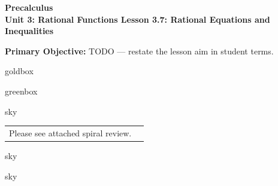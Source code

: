 \documentclass[10pt]{article}
\newcommand{\CourseName}{Precalculus}
\newcommand{\UnitNumberName}{Unit 3: Rational Functions \quad}
\newcommand{\LessonNumberName}{Lesson 3.7: Rational Equations and Inequalities}
\begin{document}
\begin{center}
    {\Large\bfseries \CourseName \\
    {\small\bfseries \UnitNumberName \LessonNumberName}}
\end{center}

\begin{tcolorbox}[colback=sky, colframe=navy, boxrule=0.9pt, arc=2mm,
    left=2mm, right=2mm, top=1.5mm, bottom=1.5mm]
    \textbf{Primary Objective:} TODO --- restate the lesson aim in student terms.
\end{tcolorbox}

\renewcommand{\arraystretch}{1.6}
\begin{skillbox}{goldbox}
\end{skillbox}

\begin{skillbox}{greenbox}
\end{skillbox}

\begin{skillbox}{sky}
    \begin{tabularx}{\linewidth}{@{}X c@{}}
        \begin{minipage}[t]{0.55\linewidth}\vspace{0pt}
            Please see attached spiral review.  %
        \end{minipage}
        &
        \begin{minipage}[t]{0.38\linewidth}\vspace{0pt}\centering
        \end{minipage}
    \end{tabularx}
\end{skillbox}

\begin{skillbox}[Hook]{sky}
\end{skillbox}

\begin{skillbox}[Lesson]{sky}
\end{skillbox}
\end{document}
